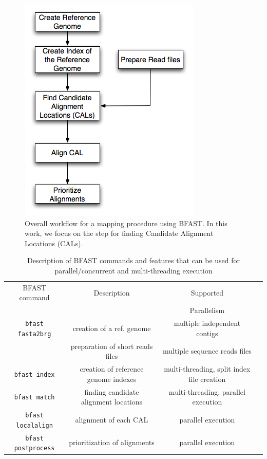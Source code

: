 \documentclass[12pt]{article}
\begin{document}
\begin{figure}
 \centering
\includegraphics[scale=0.45]{figures/workflow.png} 

\caption{\small Overall workflow for a mapping procedure using BFAST.  In this work, we focus on the step for finding Candidate Alignment Locations (CALs).  }
  \label{fig:workflow-bfast} 
 \end{figure}


\begin{table}
\begin{tabular}{|c|c|c|c|} 
  \hline 
 BFAST command & Description & Supported \\ 
  &  &     Parallelism \\\hline
\texttt{bfast fasta2brg} & creation of a ref. genome  &    multiple independent contigs \\
&  preparation of short reads files &     multiple sequence reads files \\

\texttt{bfast index} & creation of reference genome indexes& multi-threading, split index file creation\\
\texttt{bfast match} & finding candidate alignment locations  &  multi-threading, parallel execution \\
\texttt{bfast localalign} & alignment of each CAL  &   parallel execution \\
\texttt{bfast postprocess} & prioritization of alignments  &  parallel execution \\ \hline


\hline
\end{tabular} \caption{Description of BFAST commands and features that can be used for parallel/concurrent and multi-threading execution}
 \label{table:bfast-summary} 
\end{table}
\end{document}
